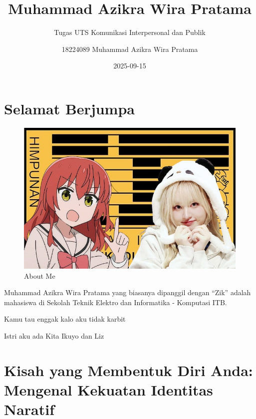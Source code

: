 \documentclass[
  letterpaper,
  DIV=11,
  numbers=noendperiod]{scrreprt}
\title{Muhammad Azikra Wira Pratama}
\subtitle{Tugas UTS Komunikasi Interpersonal dan Publik}
\author{18224089 Muhammad Azikra Wira Pratama}
\date{2025-09-15}
\renewcommand*\contentsname{Table of contents}
\newcommand\contentsname{Table of contents}
\begin{document}
\maketitle

\renewcommand*\contentsname{Table of contents}
{
\hypersetup{linkcolor=}
\setcounter{tocdepth}{2}
\tableofcontents
}


\chapter*{Selamat Berjumpa}\label{selamat-berjumpa}


\begin{figure}[H]

{\centering \includegraphics[width=9.5\linewidth,height=\textheight,keepaspectratio]{images/CoverIstri.jpg}

}

\caption{About Me}

\end{figure}%

Muhammad Azikra Wira Pratama yang biasanya dipanggil dengan ``Zik''
adalah mahasiswa di Sekolah Teknik Elektro dan Informatika - Komputasi
ITB.

Kamu tau enggak kalo aku tidak karbit

Istri aku ada Kita Ikuyo dan Liz


\chapter{\texorpdfstring{\textbf{Kisah yang Membentuk Diri Anda:
Mengenal Kekuatan Identitas
Naratif}}{Kisah yang Membentuk Diri Anda: Mengenal Kekuatan Identitas Naratif}}\label{kisah-yang-membentuk-diri-anda-mengenal-kekuatan-identitas-naratif}
\end{document}

